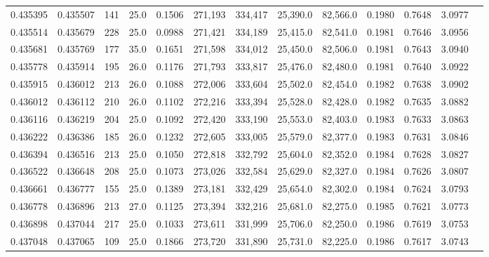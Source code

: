 \begin{tabular}{rrrrrrrrrrrrr}
0.435395 & 0.435507 &   141 & 25.0 &                                     0.1506 & 271,193 & 334,417 &  25,390.0 &  82,566.0 & 0.1980 & 0.7648 & 3.0977 \\
0.435514 & 0.435679 &   228 & 25.0 &                                     0.0988 & 271,421 & 334,189 &  25,415.0 &  82,541.0 & 0.1981 & 0.7646 & 3.0956 \\
0.435681 & 0.435769 &   177 & 35.0 &                                     0.1651 & 271,598 & 334,012 &  25,450.0 &  82,506.0 & 0.1981 & 0.7643 & 3.0940 \\
0.435778 & 0.435914 &   195 & 26.0 &                                     0.1176 & 271,793 & 333,817 &  25,476.0 &  82,480.0 & 0.1981 & 0.7640 & 3.0922 \\
0.435915 & 0.436012 &   213 & 26.0 &                                     0.1088 & 272,006 & 333,604 &  25,502.0 &  82,454.0 & 0.1982 & 0.7638 & 3.0902 \\
0.436012 & 0.436112 &   210 & 26.0 &                                     0.1102 & 272,216 & 333,394 &  25,528.0 &  82,428.0 & 0.1982 & 0.7635 & 3.0882 \\
0.436116 & 0.436219 &   204 & 25.0 &                                     0.1092 & 272,420 & 333,190 &  25,553.0 &  82,403.0 & 0.1983 & 0.7633 & 3.0863 \\
0.436222 & 0.436386 &   185 & 26.0 &                                     0.1232 & 272,605 & 333,005 &  25,579.0 &  82,377.0 & 0.1983 & 0.7631 & 3.0846 \\
0.436394 & 0.436516 &   213 & 25.0 &                                     0.1050 & 272,818 & 332,792 &  25,604.0 &  82,352.0 & 0.1984 & 0.7628 & 3.0827 \\
0.436522 & 0.436648 &   208 & 25.0 &                                     0.1073 & 273,026 & 332,584 &  25,629.0 &  82,327.0 & 0.1984 & 0.7626 & 3.0807 \\
0.436661 & 0.436777 &   155 & 25.0 &                                     0.1389 & 273,181 & 332,429 &  25,654.0 &  82,302.0 & 0.1984 & 0.7624 & 3.0793 \\
0.436778 & 0.436896 &   213 & 27.0 &                                     0.1125 & 273,394 & 332,216 &  25,681.0 &  82,275.0 & 0.1985 & 0.7621 & 3.0773 \\
0.436898 & 0.437044 &   217 & 25.0 &                                     0.1033 & 273,611 & 331,999 &  25,706.0 &  82,250.0 & 0.1986 & 0.7619 & 3.0753 \\
0.437048 & 0.437065 &   109 & 25.0 &                                     0.1866 & 273,720 & 331,890 &  25,731.0 &  82,225.0 & 0.1986 & 0.7617 & 3.0743 \\

\end{tabular}
